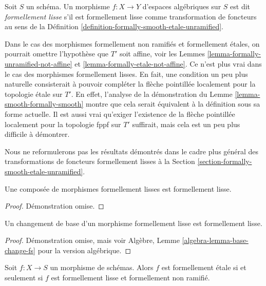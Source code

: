 \begin{definition}
\label{definition-formally-smooth}
Soit $S$ un schéma. Un morphisme $f : X \to Y$ d'espaces algébriques sur $S$
est dit {\it formellement lisse} s'il est formellement lisse comme
transformation de foncteurs au sens de la
Définition \ref{definition-formally-smooth-etale-unramified}.
\end{definition}

\noindent
Dans le cas des morphismes formellement non ramifiés et formellement étales,
on pourrait omettre l'hypothèse que $T'$ soit affine, voir les
Lemmes \ref{lemma-formally-unramified-not-affine} et
\ref{lemma-formally-etale-not-affine}.
Ce n'est plus vrai dans le cas des morphismes formellement lisses.
En fait, une condition un peu plus naturelle consisterait à pouvoir
compléter la flèche pointillée localement pour la topologie étale sur $T'$.
En effet, l'analyse de la démonstration du
Lemme \ref{lemma-smooth-formally-smooth}
montre que cela serait équivalent à la définition sous sa forme
actuelle. Il est aussi vrai qu'exiger l'existence de la flèche
pointillée localement pour la topologie fppf sur $T'$ suffirait, mais cela est un peu
plus difficile à démontrer.

\medskip\noindent
Nous ne reformulerons pas les résultats démontrés dans le cadre plus général des
transformations de foncteurs formellement lisses à la
Section \ref{section-formally-smooth-etale-unramified}.

\begin{lemma}
\label{lemma-composition-formally-smooth}
Une composée de morphismes formellement lisses est formellement lisse.
\end{lemma}

\begin{proof}
Démonstration omise.
\end{proof}

\begin{lemma}
\label{lemma-base-change-formally-smooth}
Un changement de base d'un morphisme formellement lisse est formellement lisse.
\end{lemma}

\begin{proof}
Démonstration omise, mais voir
Algèbre, Lemme \ref{algebra-lemma-base-change-fs}
pour la version algébrique.
\end{proof}

\begin{lemma}
\label{lemma-formally-etale-unramified-smooth}
Soit $f : X \to S$ un morphisme de schémas.
Alors $f$ est formellement étale si et seulement si
$f$ est formellement lisse et formellement non ramifié.
\end{lemma}

